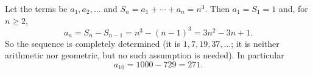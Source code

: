 Let the terms be $a_1,a_2,\dots$ and $S_n=a_1+\cdots+a_n=n^3$. Then $a_1=S_1=1$ and, for $n\ge2$,
\[
a_n=S_n-S_{n-1}=n^3-(n-1)^3=3n^2-3n+1 .
\]
So the sequence is completely determined (it is $1,7,19,37,\dots$; it is neither arithmetic nor geometric, but no such assumption is needed). In particular
\[
a_{10}=1000-729=\boxed{271}.
\]
